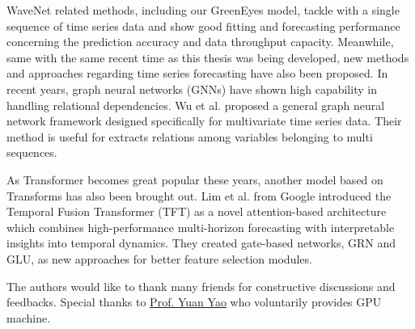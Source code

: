 \documentclass[sigconf]{acmart}
\begin{document}
WaveNet related methods, including our GreenEyes model, tackle with a single sequence of time series data and show good fitting and forecasting performance concerning the prediction accuracy and data throughput capacity. Meanwhile, same with the same recent time as this thesis was being developed, new methods and approaches regarding time series forecasting have also been proposed. In recent years, graph neural networks (GNNs) have shown high capability in handling relational dependencies. Wu et al. \cite{wu2020connecting} proposed a general graph neural network framework designed specifically for multivariate time series data. Their method is useful for extracts relations among variables belonging to multi sequences.

As Transformer \cite{vaswani2017attention} becomes great popular these years, another model based on Transforms has also been brought out. Lim et al. \cite{lim2021temporal} from Google introduced the Temporal Fusion Transformer (TFT) as a novel attention-based architecture which combines high-performance multi-horizon forecasting with interpretable insights into temporal dynamics. They created gate-based networks, GRN and GLU, as new approaches for better feature selection modules.

\begin{acks}
The authors would like to thank many friends for constructive discussions and feedbacks. Special thanks to \href{https://www.math.hkust.edu.hk/people/faculty/profile/yuany/}{Prof. Yuan Yao} who voluntarily provides GPU machine.
\end{acks}



\end{document}
